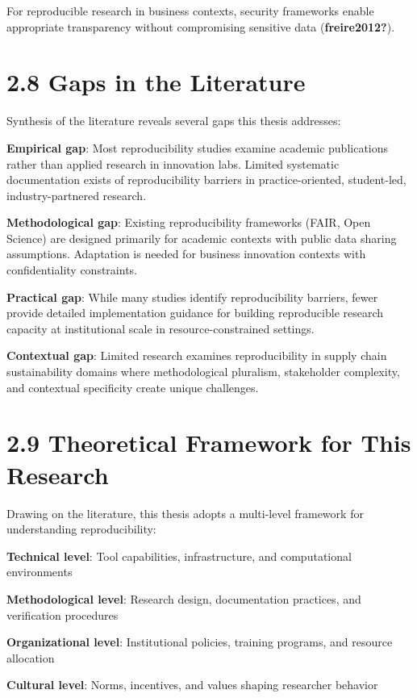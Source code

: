 \documentclass[
  oneside,
  open=any]{scrbook}
\begin{document}
For reproducible research in business contexts, security frameworks
enable appropriate transparency without compromising sensitive data
(\textbf{freire2012?}).

\section{2.8 Gaps in the Literature}\label{gaps-in-the-literature}

Synthesis of the literature reveals several gaps this thesis addresses:

\textbf{Empirical gap}: Most reproducibility studies examine academic
publications rather than applied research in innovation labs. Limited
systematic documentation exists of reproducibility barriers in
practice-oriented, student-led, industry-partnered research.

\textbf{Methodological gap}: Existing reproducibility frameworks (FAIR,
Open Science) are designed primarily for academic contexts with public
data sharing assumptions. Adaptation is needed for business innovation
contexts with confidentiality constraints.

\textbf{Practical gap}: While many studies identify reproducibility
barriers, fewer provide detailed implementation guidance for building
reproducible research capacity at institutional scale in
resource-constrained settings.

\textbf{Contextual gap}: Limited research examines reproducibility in
supply chain sustainability domains where methodological pluralism,
stakeholder complexity, and contextual specificity create unique
challenges.

\section{2.9 Theoretical Framework for This
Research}\label{theoretical-framework-for-this-research}

Drawing on the literature, this thesis adopts a multi-level framework
for understanding reproducibility:

\textbf{Technical level}: Tool capabilities, infrastructure, and
computational environments

\textbf{Methodological level}: Research design, documentation practices,
and verification procedures

\textbf{Organizational level}: Institutional policies, training
programs, and resource allocation

\textbf{Cultural level}: Norms, incentives, and values shaping
researcher behavior
\end{document}
